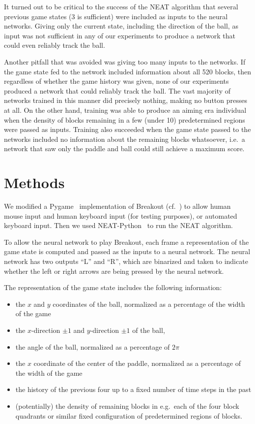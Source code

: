 \documentclass[letterpaper, twocolumn, conference]{article}
\begin{document}
It turned out to be critical to the success of the NEAT algorithm that several previous game states (3 is sufficient) were included as inputs to the neural networks. 
Giving only the current state, including the direction of the ball, as input was not sufficient in any
of our experiments to produce a network that could even reliably track the ball.

Another pitfall that was avoided was giving too many inputs to the networks.
If the game state fed to the network
included information about all 520 blocks, then regardless of whether the game history was given,
none of our experiments produced a network that could reliably track the ball.
The vast majority of networks trained in this manner did precisely nothing, making no button presses
at all.
On the other hand, training was able to produce an aiming era individual
when the density of blocks remaining in a few (under 10) predetermined regions were passed as inputs.
Training also succeeded when the game state passed to the networks included no information about the remaining blocks whatsoever, i.e.\ a network that saw only the paddle and ball could still achieve a maximum score.

\section{Methods}
We modified a Pygame~\cite{pygame} implementation of Breakout (cf.~\cite{max00355breakout}) to allow
human mouse input and human keyboard input (for testing purposes), or automated keyboard input.
Then we used NEAT-Python~\cite{neatpython} to run the NEAT algorithm.

To allow the neural network to play Breakout,
each frame a representation of the game state is computed and
passed as the inputs to a neural network.
The neural network has two outputs ``L'' and ``R'', which are binarized
and taken to indicate whether the left or right arrows are being pressed by the neural network.

The representation of the game state includes the following information:
\begin{itemize}
    \item{} the $x$ and $y$ coordinates of the ball, normalized as a percentage of the width of the game
    \item{} the $x$-direction $\pm1$ and $y$-direction $\pm 1$ of the ball,
    \item{} the angle of the ball, normalized as a percentage of $2\pi$
    \item{} the $x$ coordinate of the center of the paddle, normalized as a percentage of the width of the game
    \item{} the history of the previous four up to a fixed number of time steps in the past
    \item{} (potentially) the density of remaining blocks in e.g.\ each of the four block quadrants or similar fixed configuration of predetermined regions of blocks.
\end{itemize}
\end{document}
